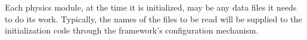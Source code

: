 \documentclass[draftmode,draftwater]{memarticle}
\begin{document}
Each physics module, at the time it is initialized, may be any data
files it needs to do its work. Typically, the names of the files to be
read will be supplied to the initialization code through the framework's
configuration mechanism.


\end{document}
